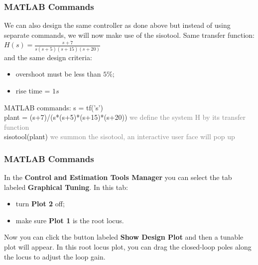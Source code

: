 \begin{frame}
\frametitle{MATLAB Commands}
	\begin{example}
		We can also design the same controller as done above but instead of using separate commands, we will now make use of the sisotool. 
		Same transfer function: $H(s) = \frac{s+7}{s(s+5)(s+15)(s+20)}$\\
		and the same design criteria: 
		\begin{itemize}
			\item overshoot must be less than $5\%$;
			\item rise time = $1s$
		\end{itemize}
		MATLAB commands:
		s = tf('s')\\
		plant = (s+7)/(s*(s+5)*(s+15)*(s+20)) \textcolor{gray}{we define the system H by its transfer function} \\
		sisotool(plant) \textcolor{gray}{we summon the sisotool, an interactive user face will pop up}\\ 
	\end{example}
\end{frame}

\begin{frame}
\frametitle{MATLAB Commands}
	\begin{exampleblock}{}
		In the \textbf{Control and Estimation Tools Manager} you can select the tab labeled \textbf{Graphical Tuning}. In this tab: 
		\begin{itemize}
			\item turn \textbf{Plot 2} off;
			\item make sure \textbf{Plot 1} is the root locus.
		\end{itemize}
		Now you can click the button labeled \textbf{Show Design Plot} and then a tunable plot will appear. In this root locus plot, you can drag the closed-loop poles along the locus to adjust the loop gain. 
	\end{exampleblock}
\end{frame}

